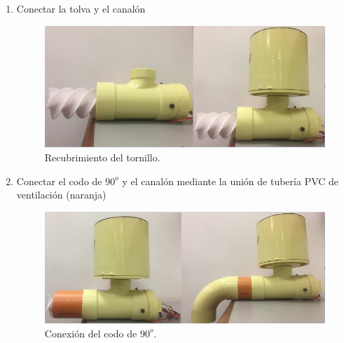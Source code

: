 \begin{enumerate}
\begin{figure}[H]
        \end{figure}
    \item Conectar la tolva y el canalón
        \begin{figure}[H]
            \begin{center}
            	\includegraphics[scale=0.62]{img/ptolva2.png}
            \end{center}
        \caption{Recubrimiento del tornillo. \label{}}
        \end{figure}
    \item Conectar el codo de $90^{o}$ y el canalón mediante la unión de tubería PVC de ventilación (naranja)
        \begin{figure}[H]
            \begin{center}
            	\includegraphics[scale=0.65]{img/pcodo2.png}
            \end{center}
        \caption{Conexión del codo de $90^{o}$. \label{}}
        \end{figure}
\end{enumerate}


